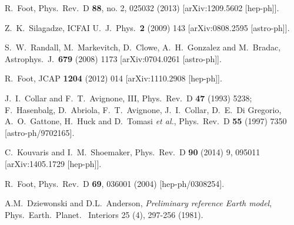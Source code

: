 \documentclass[12pt]{article}
\begin{document}
\begin{thebibliography}{999}
  
  R.~Foot,
  Phys.\ Rev.\ D {\bf 88}, no. 2, 025032 (2013)
  [arXiv:1209.5602 [hep-ph]].
  
  Z.~K.~Silagadze,
  ICFAI U.\ J.\ Phys.\  {\bf 2} (2009) 143
  [arXiv:0808.2595 [astro-ph]].
  
  S.~W.~Randall, M.~Markevitch, D.~Clowe, A.~H.~Gonzalez and M.~Bradac,
  Astrophys.\ J.\  {\bf 679} (2008) 1173
  [arXiv:0704.0261 [astro-ph]].

  R.~Foot,
  JCAP {\bf 1204} (2012) 014
  [arXiv:1110.2908 [hep-ph]].
  
  J.~I.~Collar and F.~T.~Avignone, III,
  Phys.\ Rev.\ D {\bf 47} (1993) 5238;
  F.~Hasenbalg, D.~Abriola, F.~T.~Avignone, J.~I.~Collar, D.~E.~Di Gregorio, A.~O.~Gattone, H.~Huck and D.~Tomasi {\it et al.},
  Phys.\ Rev.\ D {\bf 55} (1997) 7350
  [astro-ph/9702165].
  
  C.~Kouvaris and I.~M.~Shoemaker,
  Phys.\ Rev.\ D {\bf 90} (2014) 9,  095011
  [arXiv:1405.1729 [hep-ph]].

  R.~Foot,
  Phys.\ Rev.\ D {\bf 69}, 036001 (2004)
  [hep-ph/0308254].
  
  A.M.~Dziewonski and D.L.~Anderson, \textit{Preliminary reference Earth model},
  Phys.\ Earth.\ Planet. \ Interiors 25 (4), 297-256 (1981).
  
\end{thebibliography}
\end{document}
